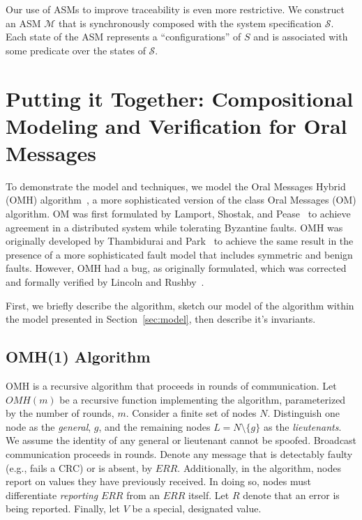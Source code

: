\documentclass{llncs/llncs}
\begin{document}
Our use of ASMs to improve traceability is even more restrictive. We construct an ASM $\mathcal{M}$ that is synchronously composed with the system specification $\mathcal{S}$. Each state of the ASM represents a ``configurations'' of $S$ and is associated with some predicate over the states of $\mathcal{S}$.


\section{Putting it Together: Compositional Modeling and Verification for Oral Messages}\label{sec:byz}

To demonstrate the model and techniques, we model the Oral Messages Hybrid (OMH) algorithm~\cite{}, a more sophisticated version of the class Oral Messages (OM) algorithm. OM was first formulated by Lamport, Shostak, and Pease~\cite{om} to achieve agreement in a distributed system while tolerating Byzantine faults. OMH was originally developed by Thambidurai and Park~\cite{hybrid} to achieve the same result in the presence of a more sophisticated fault model that includes symmetric and benign faults. However, OMH had a bug, as originally formulated, which was corrected and formally verified by Lincoln and Rushby~\cite{csl-93-2}.

First, we briefly describe the algorithm, sketch our model of the algorithm within the model presented in Section~\ref{sec:model}, then describe it's invariants.

\subsection{OMH(1) Algorithm}
OMH is a recursive algorithm that proceeds in rounds of communication. Let $OMH(m)$ be a recursive function implementing the algorithm, parameterized by the number of rounds, $m$. Consider a finite set of nodes $N$. Distinguish one node as the \emph{general}, $g$, and the remaining nodes $L = N \setminus \{g\}$ as the \emph{lieutenants}. We assume the identity of any general or lieutenant cannot be spoofed. Broadcast communication proceeds in rounds. Denote any message that is detectably faulty (e.g., fails a CRC) or is absent, by $ERR$. Additionally, in the algorithm, nodes report on values they have previously received. In doing so, nodes must differentiate \emph{reporting} $ERR$ from an $ERR$ itself. Let $R$ denote that an error is being reported. Finally, let $V$ be a special, designated value.
\end{document}
